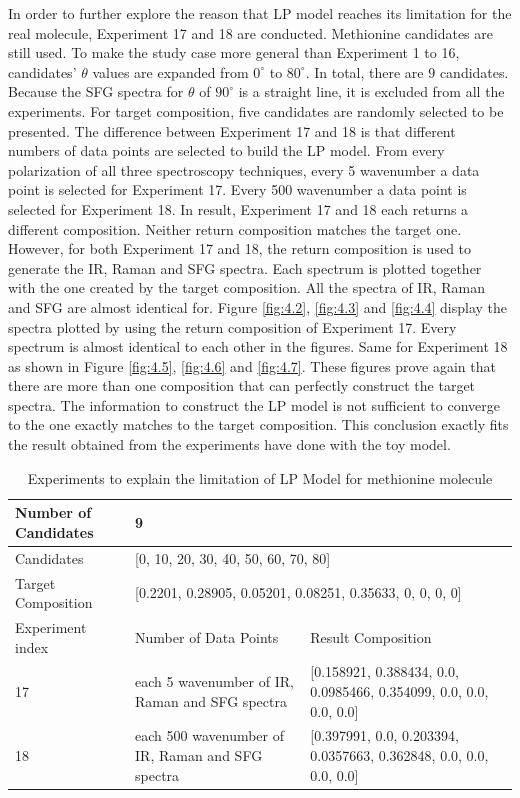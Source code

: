 In order to further explore the reason that LP model reaches its limitation for the real molecule, Experiment 17 and 18 are conducted. Methionine candidates are still used. To make the study case more general than Experiment 1 to 16, candidates' $\theta$ values are expanded from $0^{\circ}$ to $80^{\circ}$. In total, there are $9$ candidates. Because the SFG spectra for $\theta$ of $90^{\circ}$ is a straight line, it is excluded from all the experiments. For target composition, five candidates are randomly selected to be presented. The difference between Experiment 17 and 18 is that different numbers of data points are selected to build the LP model. From every polarization of all three spectroscopy techniques, every 5 wavenumber a data point is selected for Experiment 17. Every 500 wavenumber a data point is selected for Experiment 18. In result, Experiment 17 and 18 each returns a different composition. Neither return composition matches the target one. \\

However, for both Experiment 17 and 18, the return composition is used to generate the IR, Raman and SFG spectra. Each spectrum is plotted together with the one created by the target composition. All the spectra of IR, Raman and SFG are almost identical for. Figure \ref{fig:4.2}, \ref{fig:4.3} and \ref{fig:4.4} display the spectra plotted by using the return composition of Experiment 17. Every spectrum is almost identical to each other in the figures. Same for Experiment 18 as shown in Figure \ref{fig:4.5}, \ref{fig:4.6} and \ref{fig:4.7}. These figures prove again that there are more than one composition that can perfectly construct the target spectra. The information to construct the LP model is not sufficient to converge to the one exactly matches to the target composition. This conclusion exactly fits the result obtained from the experiments have done with the toy model.\\

\begin{table}\tiny \label{tab:4.4}
\begin{center}
\begin{tabular}{| l | l | l | l }
\hline
Number of Candidates & \multicolumn{2}{l|}{9} \\ \hline
Candidates & \multicolumn{2}{l|}{[0, 10, 20, 30, 40, 50, 60, 70, 80]} \\ \hline
Target Composition & \multicolumn{2}{l|}{[0.2201, 0.28905, 0.05201, 0.08251, 0.35633, 0, 0, 0, 0]} \\ \hline
Experiment index & Number of Data Points & Result Composition \\ \hline
17 & each 5 wavenumber of IR, Raman and SFG spectra & [0.158921, 0.388434, 0.0, 0.0985466, 0.354099, 0.0, 0.0, 0.0, 0.0] \\ \hline
18 & each 500 wavenumber of IR, Raman and SFG spectra & [0.397991, 0.0, 0.203394, 0.0357663, 0.362848, 0.0, 0.0, 0.0, 0.0] \\ \hline
\end{tabular} 
\end{center}
\caption{Experiments to explain the limitation of LP Model for methionine molecule}
\end{table}	

